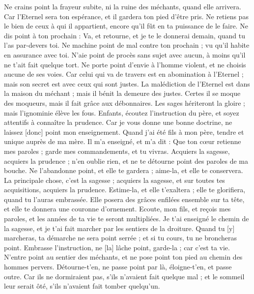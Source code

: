 \begin{multicols}{2}
Ne crains point la frayeur subite, ni la ruine des méchants, quand elle arrivera.
Car l'Eternel sera ton espérance, et il gardera ton pied d'être pris.
Ne retiens pas le bien de ceux à qui il appartient, encore qu'il fût en ta puissance de le faire.
Ne dis point à ton prochain : Va, et retourne, et je te le donnerai demain, quand tu l'as par-devers toi.
Ne machine point de mal contre ton prochain ; vu qu'il habite en assurance avec toi.
N'aie point de procès sans sujet avec aucun, à moins qu'il ne t'ait fait quelque tort.
Ne porte point d'envie à l'homme violent, et ne choisis aucune de ses voies.
Car celui qui va de travers est en abomination à l'Eternel ; mais son secret est avec ceux qui sont justes.
La malédiction de l'Eternel est dans la maison du méchant ; mais il bénit la demeure des justes.
Certes il se moque des moqueurs, mais il fait grâce aux débonnaires.
Les sages hériteront la gloire ; mais l'ignominie élève les fous.
\VerseOne{}Enfants, écoutez l'instruction du père, et soyez attentifs à connaître la prudence.
Car je vous donne une bonne doctrine, ne laissez [donc] point mon enseignement.
Quand j'ai été fils à mon père, tendre et unique auprès de ma mère.
Il m'a enseigné, et m'a dit : Que ton cœur retienne mes paroles ; garde mes commandements, et tu vivras.
Acquiers la sagesse, acquiers la prudence ; n'en oublie rien, et ne te détourne point des paroles de ma bouche.
Ne l'abandonne point, et elle te gardera ; aime-la, et elle te conservera.
La principale chose, c'est la sagesse ; acquiers la sagesse, et sur toutes tes acquisitions, acquiers la prudence.
Estime-la, et elle t'exaltera ; elle te glorifiera, quand tu l'auras embrassée.
Elle posera des grâces enfilées ensemble sur ta tête, et elle te donnera une couronne d'ornement.
Ecoute, mon fils, et reçois mes paroles, et les années de ta vie te seront multipliées.
Je t'ai enseigné le chemin de la sagesse, et je t'ai fait marcher par les sentiers de la droiture.
Quand tu [y] marcheras, ta démarche ne sera point serrée ; et si tu cours, tu ne broncheras point.
Embrasse l'instruction, ne [la] lâche point, garde-la ; car c'est ta vie.
N'entre point au sentier des méchants, et ne pose point ton pied au chemin des hommes pervers.
Détourne-t'en, ne passe point par là, éloigne-t'en, et passe outre.
Car ils ne dormiraient pas, s'ils n'avaient fait quelque mal ; et le sommeil leur serait ôté, s'ils n'avaient fait tomber quelqu'un.

\end{multicols}
